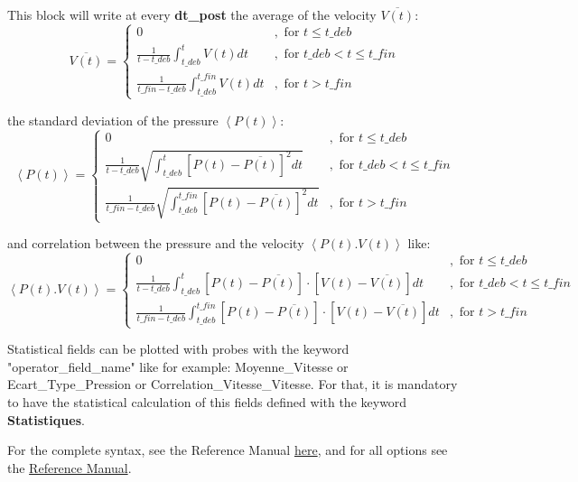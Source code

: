 \begin{itemize}
This block will write at every \textbf{dt\_post} the average of the velocity $\overline{V(t)}$:
\[
\overline{V(t)}=\left\{ \begin{array}{ll}
0 & ,\mbox{ for }t\leq t\mbox{\_}deb\\
\frac{1}{t-t\mbox{\_}deb}{\displaystyle \int_{t\mbox{\_}deb}^{t}V(t)dt} & ,\mbox{ for }t\mbox{\_}deb<t\leq t\mbox{\_}fin\\
\frac{1}{t\mbox{\_}fin-t\mbox{\_}deb}{\displaystyle \int_{t\mbox{\_}deb}^{t\mbox{\_}fin}V(t)dt} & ,\mbox{ for }t>t\mbox{\_}fin
\end{array}\right.
\]

the standard deviation of the pressure $\left\langle P(t)\right\rangle$:
\[
\left\langle P(t)\right\rangle=\left\{ \begin{array}{ll}
0 & ,\mbox{ for }t\leq t\mbox{\_}deb\\
\frac{1}{t-t\mbox{\_}deb}{\displaystyle \sqrt{\int_{t\mbox{\_}deb}^{t}\left[P(t)-\overline{P(t)}\right]^{2}dt}} & ,\mbox{ for }t\mbox{\_}deb<t\leq t\mbox{\_}fin\\
\frac{1}{t\mbox{\_}fin-t\mbox{\_}deb}{\displaystyle \sqrt{\int_{t\mbox{\_}deb}^{t\mbox{\_}fin}\left[P(t)-\overline{P(t)}\right]^{2}dt}} & ,\mbox{ for }t>t\mbox{\_}fin
\end{array}\right.
\]

and correlation between the pressure and the velocity $\left\langle P(t).V(t)\right\rangle$ like:
\[
\left\langle P(t).V(t)\right\rangle=\left\{ \begin{array}{ll}
0 & ,\mbox{ for }t\leq t\mbox{\_}deb\\
\frac{1}{t-t\mbox{\_}deb}{\displaystyle \int_{t\mbox{\_}deb}^{t}\left[P(t)-\overline{P(t)}\right]\cdot\left[V(t)-\overline{V(t)}\right]dt} & ,\mbox{ for }t\mbox{\_}deb<t\leq t\mbox{\_}fin\\
\frac{1}{t\mbox{\_}fin-t\mbox{\_}deb}{\displaystyle \int_{t\mbox{\_}deb}^{t\mbox{\_}fin}\left[P(t)-\overline{P(t)}\right]\cdot\left[V(t)-\overline{V(t)}\right]dt} & ,\mbox{ for }t>t\mbox{\_}fin
\end{array}\right.
\]


\begin{remark}
Statistical fields can be plotted with probes with the keyword "operator\_field\_name" like for example: Moyenne\_Vitesse or Ecart\_Type\_Pression or Correlation\_Vitesse\_Vitesse. For that, it is mandatory to have the statistical calculation of this fields defined with the keyword \textbf{Statistiques}.\\
\end{remark}

For the complete syntax, see the \trustref Reference Manual \href{\REFERENCEMANUAL\#corpspostraitement}{here}, and for all options see the \href{\REFERENCEMANUAL\#statsposts}{\trustref Reference Manual}.
\end{itemize}



